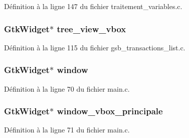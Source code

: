 Définition à la ligne 147 du fichier traitement\_\-variables.c.

\subsubsection[{tree\_\-view\_\-vbox}]{\setlength{\rightskip}{0pt plus 5cm}GtkWidget$\ast$ {\bf tree\_\-view\_\-vbox}}\label{gsb__file_8c_a852ebb7e2039cea38cf82e9d7b876d7c}


Définition à la ligne 115 du fichier gsb\_\-transactions\_\-list.c.

\subsubsection[{window}]{\setlength{\rightskip}{0pt plus 5cm}GtkWidget$\ast$ {\bf window}}\label{gsb__file_8c_a3d346c08cf2d67c388caabffb412b293}


Définition à la ligne 70 du fichier main.c.

\subsubsection[{window\_\-vbox\_\-principale}]{\setlength{\rightskip}{0pt plus 5cm}GtkWidget$\ast$ {\bf window\_\-vbox\_\-principale}}\label{gsb__file_8c_a4cd02f5b03ca212e8af64fcf0c03cef5}


Définition à la ligne 71 du fichier main.c.

